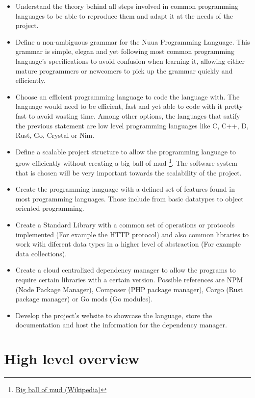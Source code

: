 \begin{itemize}
    \item Understand the theory behind all steps involved in common programming languages to be able to reproduce them and adapt it
        at the needs of the project.
    \item Define a non-ambiguous grammar for the Nuua Programming Language. This grammar is simple, elegan and yet following most
        common programming language's specifications to avoid confusion when learning it, allowing either mature programmers or newcomers to
        pick up the grammar quickly and efficiently.
    \item Choose an efficient programming language to code the language with. The language would need to be efficient, fast and yet able to code with it
        pretty fast to avoid wasting time. Among other options, the languages that satify the previous statement are low level programming languages like
        C, C++, D, Rust, Go, Crystal or Nim.
    \item Define a scalable project structure to allow the programming language to grow efficiently without creating a
        big ball of mud \footnote{\href{https://en.wikipedia.org/wiki/Big_ball_of_mud}{Big ball of mud (Wikipedia)}}. The software system
        that is chosen will be very important towards the scalability of the project.
    \item Create the programming language with a defined set of features found in most programming languages. Those include from basic datatypes
        to object oriented programming.
    \item Create a Standard Library with a common set of operations or protocols implemented (For example the HTTP protocol) and also common
        libraries to work with diferent data types in a higher level of abstraction (For example data collections).
    \item Create a cloud centralized dependency manager to allow the programs to require certain libraries with a certain version. Possible
        references are NPM (Node Package Manager), Composer (PHP package manager), Cargo (Rust package manager) or Go mods (Go modules).
    \item Develop the project's website to showcase the language, store the documentation and host the information for the dependency manager.
\end{itemize}

\section{High level overview}

